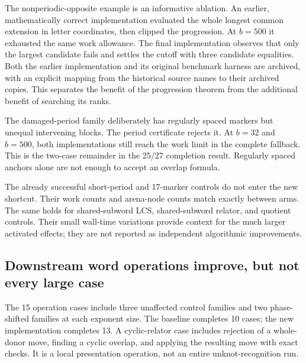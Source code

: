 The nonperiodic-opposite example is an informative ablation. An earlier,
mathematically correct implementation evaluated the whole longest common
extension in letter coordinates, then clipped the progression. At $b=500$
it exhausted the same work allowance. The final implementation observes
that only the largest candidate fails and settles the cutoff with three
candidate equalities. Both the earlier implementation and its original
benchmark harness are archived, with an explicit mapping from the historical
source names to their archived copies. This separates the benefit of the
progression theorem from the additional benefit of searching its ranks.

The damaged-period family deliberately has regularly spaced markers but
unequal intervening blocks. The period certificate rejects it. At $b=32$
and $b=500$, both implementations still reach the work limit in the complete
fallback. This is the two-case remainder in the 25/27 completion result.
Regularly spaced anchors alone are not enough to accept an overlap formula.

The already successful short-period and 17-marker controls do not enter
the new shortcut. Their work counts and arena-node counts match exactly
between arms. The same holds for shared-subword LCS, shared-subword relator,
and quotient controls. Their small wall-time variations provide context
for the much larger activated effects; they are not reported as independent
algorithmic improvements.

\subsection{Downstream word operations improve, but not every large case}

The 15 operation cases include three unaffected control families and two
phase-shifted families at each exponent size. The baseline completes
10 cases; the new implementation completes 13. A cyclic-relator case
includes rejection of a whole-donor move, finding a cyclic overlap, and
applying the resulting move with exact checks. It is a local presentation
operation, not an entire unknot-recognition run.

